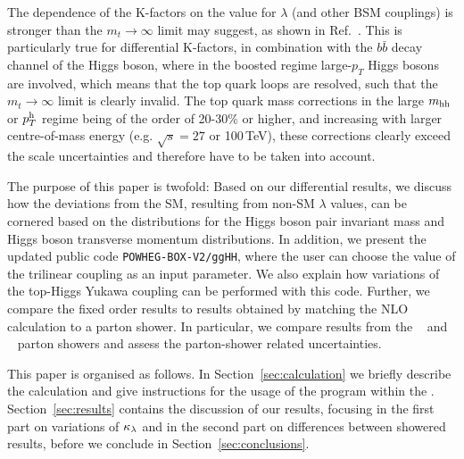 The dependence of the K-factors on the value for $\lambda$ (and other BSM couplings) is stronger than the $m_t\to\infty$ limit may suggest, as shown in Ref.~\cite{Buchalla:2018yce}. This is particularly true for differential K-factors, 
in combination with the $b\bar{b}$ decay channel of the Higgs boson, where in the boosted regime large-$p_T$ Higgs bosons are involved, which means that the top quark loops are resolved, such that the  $m_t\to\infty$ limit is clearly invalid.
The top quark mass corrections in the large $m_{\mathrm{hh}}$ or $p_T^{\mathrm{h}}$ regime being of the order of 20-30\% or higher, and increasing with larger centre-of-mass energy (e.g. $\sqrt{s}=27$ or 100\,TeV), these corrections clearly exceed the scale uncertainties and therefore have to be taken into account.

The purpose of this paper is twofold: Based on our differential results, we discuss how the deviations from the SM, resulting from non-SM $\lambda$ values, can be cornered based on the distributions for the Higgs boson pair invariant mass and Higgs boson transverse momentum distributions. 
In addition, we present the updated public code {\tt POWHEG-BOX-V2/ggHH}, where the user can choose the value of the trilinear coupling as an input parameter.
We also explain how variations of the top-Higgs Yukawa coupling can be performed with this code.
Further, we compare the fixed order results to results obtained by matching the NLO calculation to a parton shower. In particular, we compare results from the \pythia~\cite{Sjostrand:2014zea} and \herwig~\cite{Bellm:2017bvx} parton showers and assess the parton-shower related uncertainties.

This paper is organised as follows. In Section~\ref{sec:calculation} we briefly describe the calculation and give instructions for the usage of the program within the \powhegbox. Section~\ref{sec:results} contains the discussion of our results, focusing in the first part on variations of $\kappa_{\lambda}$ and in the second part on differences between showered results, 
before we conclude in Section~\ref{sec:conclusions}.

